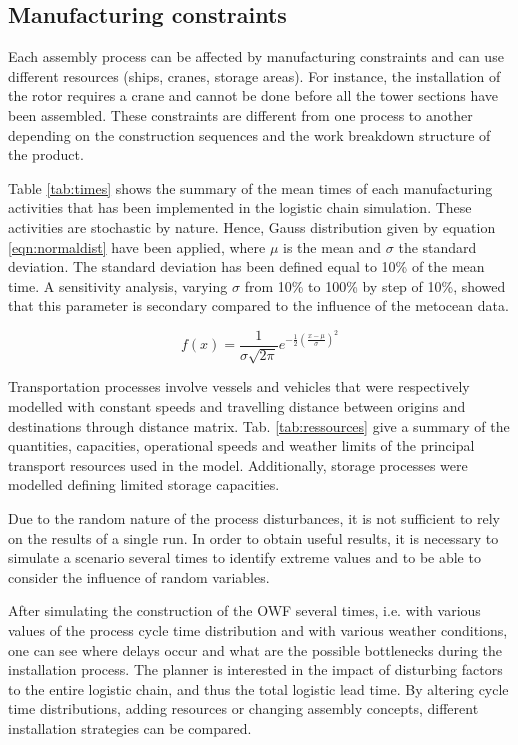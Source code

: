 \subsection{Manufacturing constraints}
Each assembly process can be affected by manufacturing constraints and can use different resources (ships, cranes, storage areas). For instance, the installation of the rotor requires a crane and cannot be done before all the tower sections have been assembled. These constraints are different from one process to another depending on the construction sequences and the work breakdown structure of the product.

Table \ref{tab:times} shows the summary of the mean times of each manufacturing activities that has been implemented in the logistic chain simulation. These activities are stochastic by nature. Hence, Gauss distribution given by equation \ref{eqn:normaldist} have been applied, where $\mu$ is the mean and $\sigma$ the standard deviation. The standard deviation has been defined equal to 10\% of the mean time. A sensitivity analysis, varying $\sigma$ from 10\% to 100\% by step of 10\%, showed that this parameter is secondary compared to the influence of the metocean data. 

\begin{equation}
\label{eqn:normaldist}
f\left( x \right) = \frac{1}{\sigma \sqrt{2 \pi} } e^{- \frac{1}{2} \left( \frac{x - \mu}{\sigma} \right)^{2}}
\end{equation}

Transportation processes involve vessels and vehicles that were respectively modelled with constant speeds and travelling distance between origins and destinations through distance matrix. Tab. \ref{tab:ressources} give a summary of the quantities, capacities, operational speeds and weather limits of the principal transport resources used in the model. Additionally, storage processes were modelled defining limited storage capacities.

Due to the random nature of the process disturbances, it is not sufficient to rely on the results of a single run. In order to obtain useful results, it is necessary to simulate a scenario several times to identify extreme values and to be able to consider the influence of random variables.

After simulating the construction of the OWF several times, i.e. with various values of the process cycle time distribution and with various weather conditions, one can see where delays occur and what are the possible bottlenecks during the installation process. The planner is interested in the impact of disturbing factors to the entire logistic chain, and thus the total logistic lead time. By altering cycle time distributions, adding resources or changing assembly concepts, different installation strategies can be compared.